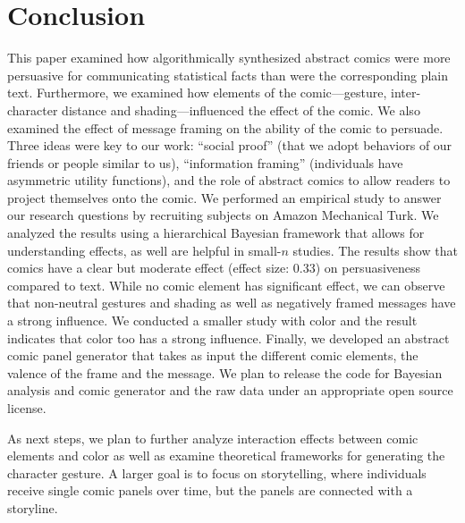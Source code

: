 \section{Conclusion}
\label{sec:Conclusion}

This paper examined how algorithmically synthesized abstract comics were more persuasive for communicating statistical facts than were the corresponding plain text. Furthermore, we examined how elements of the comic---gesture, inter-character distance and shading---influenced the effect of the comic. We also examined the effect of message framing on the ability of the comic to persuade. Three ideas were key to our work: ``social proof'' (that we adopt behaviors of our friends or people similar to us), ``information framing'' (individuals have asymmetric utility functions), and the role of abstract comics to allow readers to project themselves onto the comic. We performed an empirical study to answer our research questions by recruiting subjects on Amazon Mechanical Turk. We analyzed the results using a hierarchical Bayesian framework that allows for understanding effects, as well are helpful in small-$n$ studies. The results show that comics have a clear but moderate effect (effect size: 0.33) on persuasiveness compared to text. While no comic element has significant effect, we can observe that non-neutral gestures and shading as well as negatively framed messages have a strong influence. We conducted a smaller study with color and the result indicates that color too has a strong influence. Finally, we developed an abstract comic panel generator that takes as input the different comic elements, the valence of the frame and the message. We plan to release the code for Bayesian analysis and comic generator and the raw data under an appropriate open source license.

As next steps, we plan to further analyze interaction effects between comic elements and color as well as examine theoretical frameworks for generating the character gesture. A larger goal is to focus on storytelling, where individuals receive single comic panels over time, but the panels are connected with a storyline.

